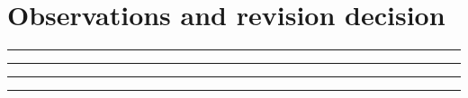 \documentclass[10pt,letterpaper]{article}
\begin{document}
\section{Observations and revision decision}
\noindent\rule{\linewidth}{0.4pt}\par\vspace{18pt}\noindent\rule{\linewidth}{0.4pt}\par\vspace{18pt}\noindent\rule{\linewidth}{0.4pt}\par\vspace{18pt}\noindent\rule{\linewidth}{0.4pt}\par\vspace{18pt}
\end{document}
